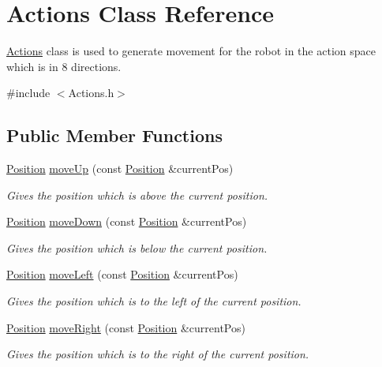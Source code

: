 \hypertarget{classActions}{}\section{Actions Class Reference}
\label{classActions}


\hyperlink{classActions}{Actions} class is used to generate movement for the robot in the action space which is in 8 directions.  




{\ttfamily \#include $<$Actions.\+h$>$}

\subsection*{Public Member Functions}
\begin{DoxyCompactItemize}
\item 
\hyperlink{structPosition}{Position} \hyperlink{classActions_aa89a2ec6e16b2ccbebdb3a21be930fa6}{move\+Up} (const \hyperlink{structPosition}{Position} \&current\+Pos)
\begin{DoxyCompactList}\small\item\em Gives the position which is above the current position. \end{DoxyCompactList}\item 
\hyperlink{structPosition}{Position} \hyperlink{classActions_aa52f67ef3ef76fa821e5a587f9582321}{move\+Down} (const \hyperlink{structPosition}{Position} \&current\+Pos)
\begin{DoxyCompactList}\small\item\em Gives the position which is below the current position. \end{DoxyCompactList}\item 
\hyperlink{structPosition}{Position} \hyperlink{classActions_adb21d8d86e5c11a29a0d8755253a739e}{move\+Left} (const \hyperlink{structPosition}{Position} \&current\+Pos)
\begin{DoxyCompactList}\small\item\em Gives the position which is to the left of the current position. \end{DoxyCompactList}\item 
\hyperlink{structPosition}{Position} \hyperlink{classActions_a324ac90167fc69643c7dbc2efc779387}{move\+Right} (const \hyperlink{structPosition}{Position} \&current\+Pos)
\begin{DoxyCompactList}\small\item\em Gives the position which is to the right of the current position. \end{DoxyCompactList}\item 

\end{DoxyCompactItemize}
